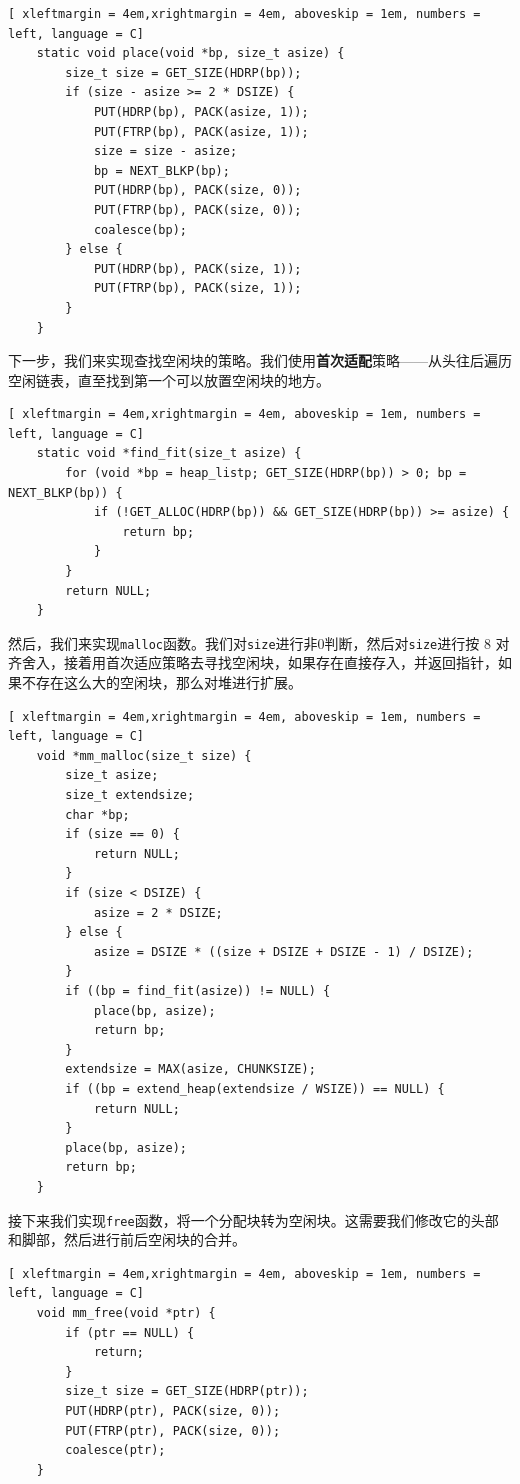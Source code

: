 \documentclass{article}
\begin{document}
\begin{lstlisting}[ xleftmargin = 4em,xrightmargin = 4em, aboveskip = 1em, numbers = left, language = C]
    static void place(void *bp, size_t asize) {
        size_t size = GET_SIZE(HDRP(bp));
        if (size - asize >= 2 * DSIZE) {
            PUT(HDRP(bp), PACK(asize, 1));
            PUT(FTRP(bp), PACK(asize, 1));
            size = size - asize;
            bp = NEXT_BLKP(bp);
            PUT(HDRP(bp), PACK(size, 0));
            PUT(FTRP(bp), PACK(size, 0));
            coalesce(bp);
        } else {
            PUT(HDRP(bp), PACK(size, 1));
            PUT(FTRP(bp), PACK(size, 1));
        }
    }
\end{lstlisting}

下一步，我们来实现查找空闲块的策略。我们使用\textbf{首次适配}策略——从头往后遍历空闲链表，直至找到第一个可以放置空闲块的地方。

\begin{lstlisting}[ xleftmargin = 4em,xrightmargin = 4em, aboveskip = 1em, numbers = left, language = C]
    static void *find_fit(size_t asize) {
        for (void *bp = heap_listp; GET_SIZE(HDRP(bp)) > 0; bp = NEXT_BLKP(bp)) {
            if (!GET_ALLOC(HDRP(bp)) && GET_SIZE(HDRP(bp)) >= asize) {
                return bp;
            }
        }
        return NULL;
    }
\end{lstlisting}

然后，我们来实现\texttt{malloc}函数。我们对\texttt{size}进行非0判断，然后对\texttt{size}进行按 8 对齐舍入，接着用首次适应策略去寻找空闲块，如果存在直接存入，并返回指针，如果不存在这么大的空闲块，那么对堆进行扩展。

\begin{lstlisting}[ xleftmargin = 4em,xrightmargin = 4em, aboveskip = 1em, numbers = left, language = C]
    void *mm_malloc(size_t size) {
        size_t asize;
        size_t extendsize;
        char *bp;
        if (size == 0) {
            return NULL;
        }
        if (size < DSIZE) {
            asize = 2 * DSIZE;
        } else {
            asize = DSIZE * ((size + DSIZE + DSIZE - 1) / DSIZE);
        }
        if ((bp = find_fit(asize)) != NULL) {
            place(bp, asize);
            return bp;
        }
        extendsize = MAX(asize, CHUNKSIZE);
        if ((bp = extend_heap(extendsize / WSIZE)) == NULL) {
            return NULL;
        }
        place(bp, asize);
        return bp;
    }
\end{lstlisting}

接下来我们实现\texttt{free}函数，将一个分配块转为空闲块。这需要我们修改它的头部和脚部，然后进行前后空闲块的合并。
\begin{lstlisting}[ xleftmargin = 4em,xrightmargin = 4em, aboveskip = 1em, numbers = left, language = C]
    void mm_free(void *ptr) {
        if (ptr == NULL) {
            return;
        }
        size_t size = GET_SIZE(HDRP(ptr));
        PUT(HDRP(ptr), PACK(size, 0));
        PUT(FTRP(ptr), PACK(size, 0));
        coalesce(ptr);
    }
\end{lstlisting}
\end{document}
